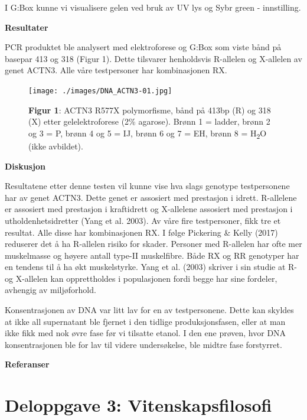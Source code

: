 \documentclass[
  letterpaper,
  DIV=11,
  numbers=noendperiod]{scrreprt}
\begin{document}
I G:Box kunne vi visualisere gelen ved bruk av UV lys og Sybr green -
innstilling.

\textbf{Resultater}

PCR produktet ble analysert med elektroforese og G:Box som viste bånd på
basepar 413 og 318 (Figur 1). Dette tilsvarer henholdsvis R-allelen og
X-allelen av genet ACTN3. Alle våre testpersoner har kombinasjonen RX.

\begin{figure}

\texttt{[image: ./images/DNA\_ACTN3-01.jpg]} \hfill{}

\caption{\textbf{Figur 1}: ACTN3 R577X polymorfisme, bånd på 413bp (R)
og 318 (X) etter gelelektroforese (2\% agarose). Brønn 1 = ladder, brønn
2 og 3 = P, brønn 4 og 5 = IJ, brønn 6 og 7 = EH, brønn 8 =
H\textsubscript{2}O (ikke avbildet).}

\end{figure}

\textbf{Diskusjon}

Resultatene etter denne testen vil kunne vise hva slags genotype
testpersonene har av genet ACTN3. Dette genet er assosiert med
prestasjon i idrett. R-allelene er assosiert med prestasjon i
kraftidrett og X-allelene assosiert med prestasjon i
utholdenhetsidretter (Yang et al. 2003). Av våre fire testpersoner, fikk
tre et resultat. Alle disse har kombinasjonen RX. I følge Pickering \&
Kelly (2017) reduserer det å ha R-allelen risiko for skader. Personer
med R-allelen har ofte mer muskelmasse og høyere antall type-II
muskelfibre. Både RX og RR genotyper har en tendens til å ha økt
muskelstyrke. Yang et al. (2003) skriver i sin studie at R- og X-allelen
kan opprettholdes i populasjonen fordi begge har sine fordeler, avhengig
av miljøforhold.

Konsentrasjonen av DNA var litt lav for en av testpersonene. Dette kan
skyldes at ikke all supernatant ble fjernet i den tidlige
produksjonsfasen, eller at man ikke fikk med nok øvre fase før vi
tilsatte etanol. I den ene prøven, hvor DNA konsentrasjonen ble for lav
til videre undersøkelse, ble midtre fase forstyrret.

\textbf{Referanser}


\hypertarget{deloppgave-3-vitenskapsfilosofi}{%
\chapter{Deloppgave 3:
Vitenskapsfilosofi}\label{deloppgave-3-vitenskapsfilosofi}}
\end{document}
